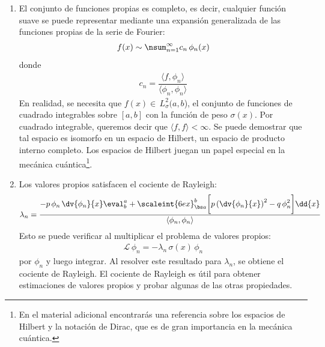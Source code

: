 \begin{enumerate}
\item El conjunto de funciones propias es completo, es decir, cualquier función suave se puede representar mediante una expansión generalizada de las funciones propias de la serie de Fourier:
\begin{align*}
f(x) \sim \nsum_{n=1}^{\infty} c_{n} \, \phi_{n} (x)
\end{align*}
donde
\begin{align*}
c_{n} = \dfrac{\langle f, \phi_{n} \rangle}{\langle \phi_{n}, \phi_{n} \rangle}
\end{align*}
En realidad, se necesita que $f (x) \in \, L_{\sigma}^{2} (a, b$), el conjunto de funciones de cuadrado integrables sobre $[a, b]$ con la función de peso $\sigma (x)$. Por cuadrado integrable, queremos decir que $\langle f,  f \rangle < \infty$. Se puede demostrar que tal espacio es isomorfo en un espacio de Hilbert, un espacio de producto interno completo. Los espacios de Hilbert juegan un papel especial en la mecánica cuántica\footnote{En el material adicional encontrarás una referencia sobre los espacios de Hilbert y la notación de Dirac, que es de gran importancia en la mecánica cuántica.}.
\item Los valores propios satisfacen el cociente de Rayleigh:
\begin{align*}
\lambda_{n} = \dfrac{- p \, \phi_{n} \, \displaystyle \dv{\phi_{n}}{x} \eval_{b}^{a} + \scaleint{6ex}_{\bs a}^{b} \bigg[ p \left( \dv{\phi_{n}}{x} \right)^{2} - q \, \phi_{n}^{2} \bigg] \dd{x}}{\langle  \phi_{n}, \phi_{n} \rangle} 
\end{align*}
Esto se puede verificar al multiplicar el problema de valores propios:
\begin{align*}
\mathcal{L} \, \phi_{n} = - \lambda_{n} \, \sigma(x) \, \phi_{n}
\end{align*}
por $\phi_{n}$ y luego integrar. Al resolver este resultado para $\lambda_{n}$, se obtiene el cociente de Rayleigh. El cociente de Rayleigh es útil para obtener estimaciones de valores propios y probar algunas de las otras propiedades.
\end{enumerate}

